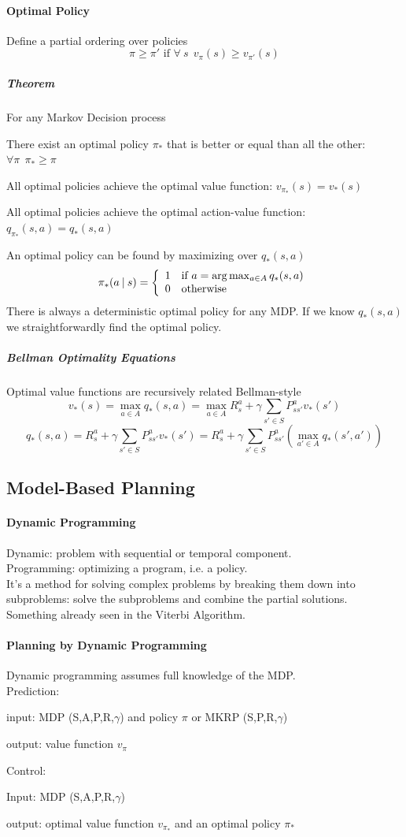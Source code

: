\documentclass[10pt]{report}
\begin{document}
\paragraph{Optimal Policy} Define a partial ordering over policies $$\pi\geq \pi'\text{ if }\forall\:s\:\:v_\pi(s)\geq v_{\pi'}(s)$$
\subparagraph{Theorem} For any Markov Decision process\begin{list}{}{}
	\item There exist an optimal policy $\pi_*$ that is better or equal than all the other: $\forall\pi\:\:\pi_*\geq \pi$
	\item All optimal policies achieve the optimal value function: $v_{\pi_*}(s) = v_*(s)$
	\item All optimal policies achieve the optimal action-value function: $q_{\pi_*}(s,a) = q_*(s,a)$
\end{list}
An optimal policy can be found by maximizing over $q_*(s,a)$
$$\pi_*(a\:|\:s)=\left\{\begin{array}{l l}
1&\text{if }a=\arg\max_{a\in A} q_*(s,a)\\
0&\text{otherwise}
\end{array}\right.$$
There is always a deterministic optimal policy for any MDP. If we know $q_*(s,a)$ we straightforwardly find the optimal policy.
\subparagraph{Bellman Optimality Equations} Optimal value functions are recursively related Bellman-style
$$v_*(s)= \max_{a\in A}q_*(s,a) = \max_{a\in A}R_s^a + \gamma\sum_{s'\in S}P_{ss'}^av_*(s')$$
$$q_*(s,a)=R_s^a + \gamma\sum_{s'\in S} P_{ss'}^av_*(s') = R_s^a + \gamma\sum_{s'\in S}P_{ss'}^a\left(\max_{a'\in A}q_*(s',a')\right)$$
\subsection{Model-Based Planning}
\paragraph{Dynamic Programming} Dynamic: problem with sequential or temporal component.\\
Programming: optimizing a program, i.e. a policy.\\
It's a method for solving complex problems by breaking them down into subproblems: solve the subproblems and combine the partial solutions.\\
Something already seen in the Viterbi Algorithm.
\paragraph{Planning by Dynamic Programming} Dynamic programming assumes full knowledge of the MDP.\\
Prediction:\begin{list}{}{}
	\item input: MDP (S,A,P,R,$\gamma$) and policy $\pi$ or MKRP (S,P,R,$\gamma$)
	\item output: value function $v_\pi$
\end{list}
Control:
\begin{list}{}{}
	\item Input: MDP (S,A,P,R,$\gamma$)
	\item output: optimal value function $v_{\pi_*}$ and an optimal policy $\pi_*$
\end{list}
\end{document}
